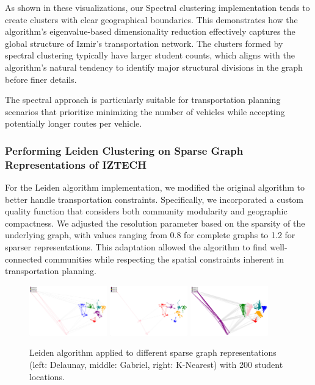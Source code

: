 As shown in these visualizations, our Spectral clustering implementation tends to create clusters with clear geographical boundaries. This demonstrates how the algorithm's eigenvalue-based dimensionality reduction effectively captures the global structure of Izmir's transportation network. The clusters formed by spectral clustering typically have larger student counts, which aligns with the algorithm's natural tendency to identify major structural divisions in the graph before finer details.

The spectral approach is particularly suitable for transportation planning scenarios that prioritize minimizing the number of vehicles while accepting potentially longer routes per vehicle.

\subsubsection{Performing Leiden Clustering on Sparse Graph Representations of IZTECH}
\label{subsubsec:leiden_implementation}

For the Leiden algorithm implementation, we modified the original algorithm to better handle transportation constraints. Specifically, we incorporated a custom quality function that considers both community modularity and geographic compactness. We adjusted the resolution parameter based on the sparsity of the underlying graph, with values ranging from 0.8 for complete graphs to 1.2 for sparser representations. This adaptation allowed the algorithm to find well-connected communities while respecting the spatial constraints inherent in transportation planning.

\begin{figure}[htbp]
\centering
\includegraphics[width=0.3\textwidth]{./img/Leiden_Delaunay}
\hspace{0.2cm}
\includegraphics[width=0.3\textwidth]{./img/Leiden_Gabriel}
\hspace{0.2cm}
\includegraphics[width=0.3\textwidth]{./img/Leiden_K}

\caption{Leiden algorithm applied to different sparse graph representations (left: Delaunay, middle: Gabriel, right: K-Nearest) with 200 student locations.}
\label{fig:leiden_clustering}
\end{figure}

